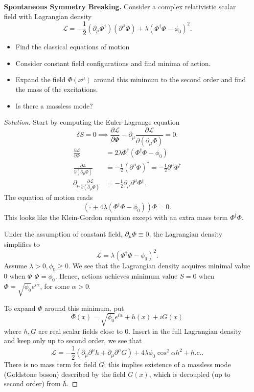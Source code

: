 \textbf{Spontaneous Symmetry Breaking.} Consider a complex relativistic scalar field with Lagrangian density
\[
	\mathcal{L} = - \frac{1}{2} \left( \partial_\mu \Phi^\dag \right) \left( \partial^\mu \Phi \right) 
	+ \lambda \left( \Phi^\dag \Phi - \phi_0 \right) ^2
.\] 
\begin{itemize}
	\item Find the classical equations of motion
	\item Consider constant field configurations and find minima of action.
	\item Expand the field $\Phi(x^\mu)$ around this minimum to the second order and find the mass of the excitations.
	\item Is there a massless mode?
\end{itemize}

\begin{proof}[Solution]
	Start by computing the Euler-Lagrange equation
	\[
		\delta S = 0 \implies
		\frac{\partial \mathcal{L}}{\partial \Phi}  - \partial_\mu \frac{\partial \mathcal{L}}{\partial (\partial_\mu \Phi)}  = 0
	.\] 
	\begin{align*}
		\frac{\partial \mathcal{L}}{\partial \Phi} &= 2 \lambda \Phi^\dag \left( \Phi^\dag \Phi - \phi_0 \right) \\
		\frac{\partial \mathcal{L}}{\partial (\partial_\mu \Phi)} &= - \frac{1}{2} (\partial^\mu \Phi)^\dag = - \frac{1}{2} \partial^\mu \Phi^\dag \\
		\partial_\mu \frac{\partial \mathcal{L}}{\partial (\partial_\mu \Phi)} &= - \frac{1}{2} \partial_\mu \partial^\mu \Phi^\dag
	.\end{align*}
	The equation of motion reads
	\[
		( \square + 4 \lambda \left( \Phi^\dag \Phi - \phi_0 \right) ) \Phi = 0
	.\] 
	This looks like the Klein-Gordon equation except with an extra mass term $\Phi^\dag \Phi$.

	Under the assumption of constant field, $\partial _\mu \Phi \equiv 0$, the Lagrangian density simplifies to
	\[
		\mathcal{L} = \lambda \left( \Phi^\dag \Phi - \phi_0 \right) ^2
	.\] 
	Assume $\lambda > 0, \phi_0 \ge 0$. We see that the Lagrangian density acquires minimal value $0$ when $\Phi^\dag \Phi = \phi_0$. Hence, actions achieves minimum value $S = 0$ when $\Phi = \sqrt{\phi_0} e^{i \alpha}$, for some $\alpha > 0$.

	To expand $\Phi$ around this minimum, put
	\[
		\Phi(x) = \sqrt{\phi_0}  e^{i \alpha} + h(x) + i G(x)
	\] 
	where $h, G$ are real scalar fields close to $0$. Insert in the full Lagrangian density and keep only up to second order, we see that
	\[
		\mathcal{L} = - \frac{1}{2}( \partial_\mu \partial^\mu h + \partial_\mu \partial^\mu G) 
		+ 4 \lambda \phi_0 \cos^2 \alpha h^2 + h.c.
	.\] 
	There is no mass term for field  $G$; this implies existence of a massless mode (Goldstone boson) described by the field $G(x)$, which is decoupled (up to second order) from $h$.
\end{proof}


